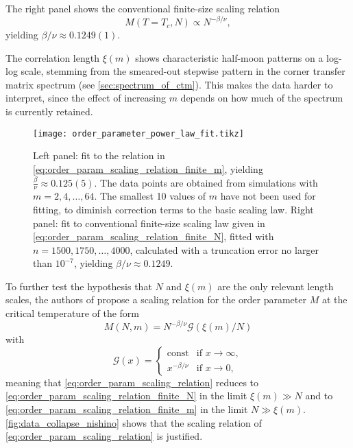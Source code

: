 The right panel shows the conventional finite-size scaling relation
\begin{equation}\label{eq:order_param_scaling_relation_finite_N}
  M(T = T_c, N) \propto N^{-\beta/\nu},
\end{equation}
yielding $\beta/\nu \approx 0.1249(1)$.

The correlation length $\xi(m)$ shows characteristic half-moon patterns on a log-log scale,
stemming from the smeared-out stepwise pattern in the corner transfer matrix spectrum (see
\autoref{sec:spectrum_of_ctm}).
This makes the data harder to interpret, since the effect of increasing $m$ depends on how much of the spectrum is
currently retained.

\begin{figure}
  \texttt{[image: order\_parameter\_power\_law\_fit.tikz]}
  \caption{Left panel: fit to the relation in
  \autoref{eq:order_param_scaling_relation_finite_m}, yielding $\frac{\beta}{\nu} \approx
  0.125(5)$. The data points are obtained from simulations with $m = 2, 4, \dots, 64$. The
  smallest 10 values of $m$ have not been used for fitting, to diminish correction terms
  to the basic scaling law. Right panel: fit to conventional finite-size scaling law
  given in \autoref{eq:order_param_scaling_relation_finite_N}, fitted with $n = 1500, 1750, \dots, 4000$, calculated with a truncation error no larger than $10^{-7}$, yielding $\beta/\nu \approx 0.1249$.
  }
  \label{fig:order_parameter_power_law_fit}
\end{figure}

To further test the hypothesis that $N$ and $\xi(m)$ are the only relevant length scales,
the authors of \cite{nishino1996numerical} propose a scaling relation for the order
parameter $M$ at the critical temperature of the form
\begin{equation}\label{eq:order_param_scaling_relation}
  M(N, m) = N^{-\beta/\nu} \mathcal{G}(\xi(m) / N)
\end{equation}
with
\begin{equation}
  \mathcal{G}(x) =
  \begin{cases}
    \text{const} & \text{if } x \to \infty, \\
    x^{-\beta/\nu} & \text{if } x \to 0,
  \end{cases}
\end{equation}
meaning that \autoref{eq:order_param_scaling_relation} reduces to
\autoref{eq:order_param_scaling_relation_finite_N} in the limit $\xi(m) \gg N$ and to
\autoref{eq:order_param_scaling_relation_finite_m} in the limit $N \gg \xi(m)$.
\autoref{fig:data_collapse_nishino} shows that the scaling relation of \autoref{eq:order_param_scaling_relation}
is justified.

